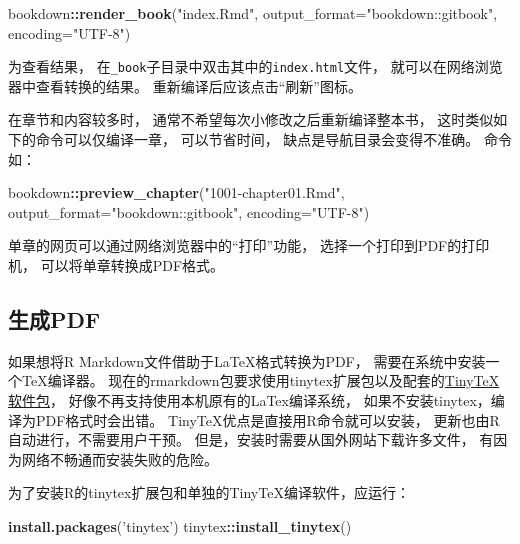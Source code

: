 \documentclass[
]{book}
\newenvironment{Shaded}{\begin{snugshade}}{\end{snugshade}}
\newcommand{\DataTypeTok}[1]{\textcolor[rgb]{0.13,0.29,0.53}{#1}}
\newcommand{\KeywordTok}[1]{\textcolor[rgb]{0.13,0.29,0.53}{\textbf{#1}}}
\newcommand{\NormalTok}[1]{#1}
\newcommand{\OperatorTok}[1]{\textcolor[rgb]{0.81,0.36,0.00}{\textbf{#1}}}
\newcommand{\StringTok}[1]{\textcolor[rgb]{0.31,0.60,0.02}{#1}}
\theoremstyle{definition}
\theoremstyle{definition}
\theoremstyle{definition}
\theoremstyle{definition}
\theoremstyle{remark}
\begin{document}
\begin{Shaded}
\begin{Highlighting}[]
\NormalTok{bookdown}\OperatorTok{::}\KeywordTok{render_book}\NormalTok{(}\StringTok{"index.Rmd"}\NormalTok{, }
  \DataTypeTok{output_format=}\StringTok{"bookdown::gitbook"}\NormalTok{, }\DataTypeTok{encoding=}\StringTok{"UTF-8"}\NormalTok{)}
\end{Highlighting}
\end{Shaded}

为查看结果，
在\texttt{\_book}子目录中双击其中的\texttt{index.html}文件，
就可以在网络浏览器中查看转换的结果。
重新编译后应该点击``刷新''图标。

在章节和内容较多时，
通常不希望每次小修改之后重新编译整本书，
这时类似如下的命令可以仅编译一章，
可以节省时间，
缺点是导航目录会变得不准确。
命令如：

\begin{Shaded}
\begin{Highlighting}[]
\NormalTok{bookdown}\OperatorTok{::}\KeywordTok{preview_chapter}\NormalTok{(}\StringTok{"1001-chapter01.Rmd"}\NormalTok{,}
  \DataTypeTok{output_format=}\StringTok{"bookdown::gitbook"}\NormalTok{, }\DataTypeTok{encoding=}\StringTok{"UTF-8"}\NormalTok{)}
\end{Highlighting}
\end{Shaded}

单章的网页可以通过网络浏览器中的``打印''功能，
选择一个打印到PDF的打印机，
可以将单章转换成PDF格式。

\hypertarget{usage-pdfbook}{%
\subsection{生成PDF}\label{usage-pdfbook}}

如果想将R Markdown文件借助于LaTeX格式转换为PDF，
需要在系统中安装一个TeX编译器。
现在的rmarkdown包要求使用tinytex扩展包以及配套的\href{https://yihui.name/tinytex/}{TinyTeX软件包}，
好像不再支持使用本机原有的LaTex编译系统，
如果不安装tinytex，编译为PDF格式时会出错。
TinyTeX优点是直接用R命令就可以安装，
更新也由R自动进行，不需要用户干预。
但是，安装时需要从国外网站下载许多文件，
有因为网络不畅通而安装失败的危险。

为了安装R的tinytex扩展包和单独的TinyTeX编译软件，应运行：

\begin{Shaded}
\begin{Highlighting}[]
\KeywordTok{install.packages}\NormalTok{(}\StringTok{'tinytex'}\NormalTok{)}
\NormalTok{tinytex}\OperatorTok{::}\KeywordTok{install_tinytex}\NormalTok{()}
\end{Highlighting}
\end{Shaded}
\end{document}
